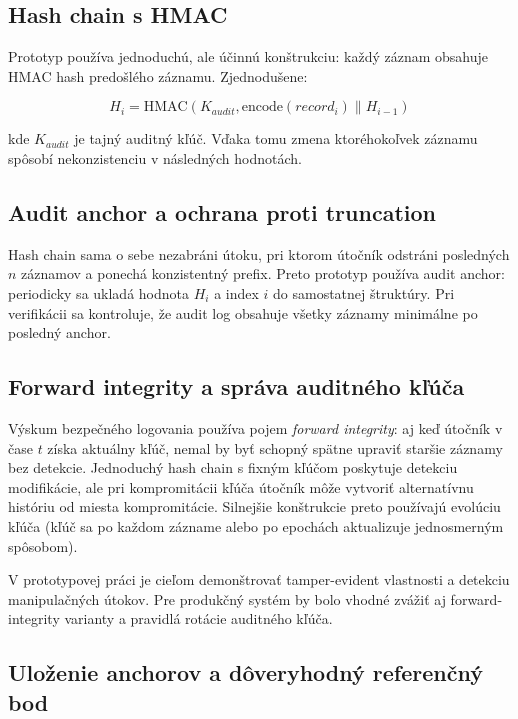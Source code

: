 \documentclass[journal,a4paper,onecolumn]{IEEEtran}
\begin{document}
\subsection{Hash chain s HMAC}

Prototyp používa jednoduchú, ale účinnú konštrukciu: každý záznam obsahuje HMAC hash predošlého záznamu. Zjednodušene:

\begin{equation}
H_i = \mathrm{HMAC}(K_{audit}, \mathrm{encode}(record_i) \parallel H_{i-1})
\end{equation}

kde \(K_{audit}\) je tajný auditný kľúč. Vďaka tomu zmena ktoréhokoľvek záznamu spôsobí nekonzistenciu v následných hodnotách.

\subsection{Audit anchor a ochrana proti truncation}

Hash chain sama o sebe nezabráni útoku, pri ktorom útočník odstráni posledných \(n\) záznamov a ponechá konzistentný prefix. Preto prototyp používa audit anchor: periodicky sa ukladá hodnota \(H_i\) a index \(i\) do samostatnej štruktúry. Pri verifikácii sa kontroluje, že audit log obsahuje všetky záznamy minimálne po posledný anchor.

\subsection{Forward integrity a správa auditného kľúča}

Výskum bezpečného logovania používa pojem \emph{forward integrity}: aj keď útočník v čase $t$ získa aktuálny kľúč, nemal by byť schopný spätne upraviť staršie záznamy bez detekcie. Jednoduchý hash chain s fixným kľúčom poskytuje detekciu modifikácie, ale pri kompromitácii kľúča útočník môže vytvoriť alternatívnu históriu od miesta kompromitácie. Silnejšie konštrukcie preto používajú evolúciu kľúča (kľúč sa po každom zázname alebo po epochách aktualizuje jednosmerným spôsobom).\cite{SchneierKelsey1999}

V prototypovej práci je cieľom demonštrovať tamper-evident vlastnosti a detekciu manipulačných útokov. Pre produkčný systém by bolo vhodné zvážiť aj forward-integrity varianty a pravidlá rotácie auditného kľúča.

\subsection{Uloženie anchorov a dôveryhodný referenčný bod}
\end{document}
